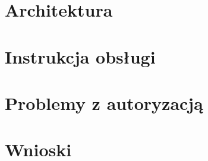 \section{Architektura}\label{sec:architektura}


\section{Instrukcja obsługi}\label{sec:instrukcja}


\section{Problemy z autoryzacją}\label{sec:post_mortem}


\section{Wnioski}\label{sec:wnioski}






